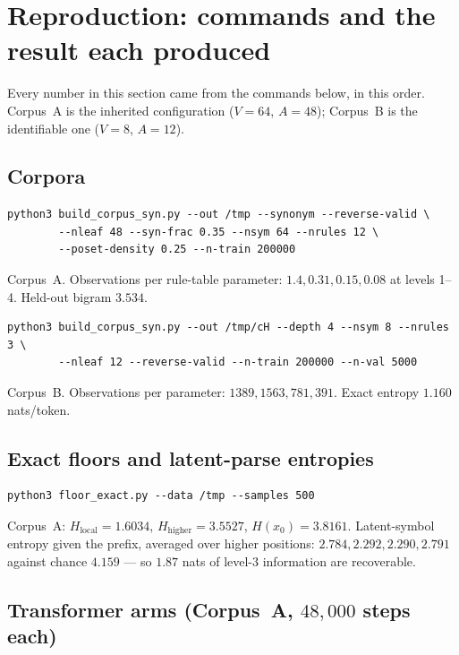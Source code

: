 \section{Reproduction: commands and the result each produced}
\label{sec:hier-repro}

Every number in this section came from the commands below, in this order.
Corpus~A is the inherited configuration ($V=64$, $A=48$); Corpus~B is the
identifiable one ($V=8$, $A=12$).

\subsection*{Corpora}

\begin{verbatim}
python3 build_corpus_syn.py --out /tmp --synonym --reverse-valid \
        --nleaf 48 --syn-frac 0.35 --nsym 64 --nrules 12 \
        --poset-density 0.25 --n-train 200000
\end{verbatim}
Corpus~A. Observations per rule-table parameter: $1.4, 0.31, 0.15, 0.08$ at
levels 1--4. Held-out bigram $3.534$.

\begin{verbatim}
python3 build_corpus_syn.py --out /tmp/cH --depth 4 --nsym 8 --nrules 3 \
        --nleaf 12 --reverse-valid --n-train 200000 --n-val 5000
\end{verbatim}
Corpus~B. Observations per parameter: $1389, 1563, 781, 391$. Exact entropy
$1.160$ nats/token.

\subsection*{Exact floors and latent-parse entropies}

\begin{verbatim}
python3 floor_exact.py --data /tmp --samples 500
\end{verbatim}
Corpus~A: $H_{\mathrm{local}}=1.6034$, $H_{\mathrm{higher}}=3.5527$,
$H(x_0)=3.8161$. Latent-symbol entropy given the prefix, averaged over higher
positions: $2.784, 2.292, 2.290, 2.791$ against chance $4.159$ --- so $1.87$
nats of level-3 information are recoverable.

\subsection*{Transformer arms (Corpus~A, $48{,}000$ steps each)}

